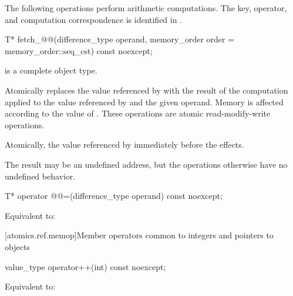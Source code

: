 \pnum
The following operations perform arithmetic computations.
The key, operator, and computation correspondence is identified
in .

%
%
\begin{itemdecl}
T* fetch_@@(difference_type operand, memory_order order = memory_order::seq_cst) const noexcept;
\end{itemdecl}

\begin{itemdescr}
\pnum
\mandates
{} is a complete object type.

\pnum
\effects
Atomically replaces the value referenced by  with
the result of the computation applied to the value referenced by 
and the given operand.
Memory is affected according to the value of .
These operations are atomic read-modify-write operations.

\pnum
\returns
Atomically, the value referenced by 
immediately before the effects.

\pnum
\remarks
The result may be an undefined address,
but the operations otherwise have no undefined behavior.
\end{itemdescr}

%
%
\begin{itemdecl}
T* operator @@=(difference_type operand) const noexcept;
\end{itemdecl}

\begin{itemdescr}
\pnum
\effects
Equivalent to:
\end{itemdescr}

[atomics.ref.memop]{Member operators
                          common to integers and pointers to objects}

%
%
\begin{itemdecl}
value_type operator++(int) const noexcept;
\end{itemdecl}

\begin{itemdescr}
\pnum
\effects
Equivalent to: 
\end{itemdescr}

